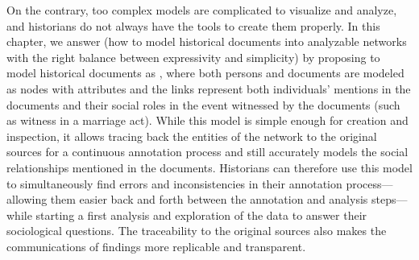 On the contrary, too complex models are complicated to visualize and analyze, and historians do not always have the tools to create them properly.
In this chapter, we answer \qone (how to model historical documents into analyzable networks with the right balance between expressivity and simplicity) by proposing to model historical documents as \modelplural, where both persons and documents are modeled as nodes with attributes and the links represent both individuals' mentions in the documents and their social roles in the event witnessed by the documents (such as witness in a marriage act).
While this model is simple enough for creation and inspection, it allows tracing back the entities of the network to the original sources for a continuous annotation process and still accurately models the social relationships mentioned in the documents.
Historians can therefore use this model to simultaneously find errors and inconsistencies in their annotation process---allowing them easier back and forth between the annotation and analysis steps---while starting a first analysis and exploration of the data to answer their sociological questions.
The traceability to the original sources also makes the communications of findings more replicable and transparent.

